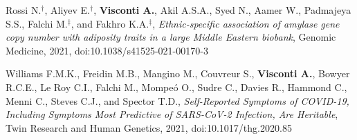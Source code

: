{\begin{itemize}
	    Rossi N.$^{\textbf{$\dag $}}$, Aliyev E.$^{\textbf{$\dag $}}$, \textbf{Visconti A.}, Akil A.S.A., Syed N., Aamer W., Padmajeya S.S., Falchi M.$^{\textbf{$\ddag $}}$, and Fakhro K.A.$^{\textbf{$\ddag $}}$, \emph{Ethnic-specific association of amylase gene copy number with adiposity traits in a large Middle Eastern biobank}, Genomic Medicine, 2021, doi:10.1038/s41525-021-00170-3
		
 	   	Williams F.M.K., Freidin M.B., Mangino M., Couvreur S., \textbf{Visconti A.}, Bowyer R.C.E., Le Roy C.I., Falchi M., Mompe\'o O., Sudre C., Davies R., Hammond C., Menni C., Steves C.J., and Spector T.D., \emph{Self-Reported Symptoms of COVID-19, Including Symptoms Most Predictive of SARS-CoV-2 Infection, Are Heritable}, Twin Research and Human Genetics, 2021, doi:10.1017/thg.2020.85
		
	\end{itemize}
}

